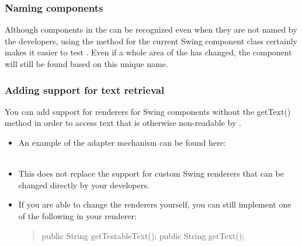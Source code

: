
\subsubsection{Naming components}
Although components in the \gdaut{} can be recognized even  when they are not named by the developers, using the  method for the current Swing component class certainly makes it easier to test \gdauts{}. Even if a whole area of the \gdaut{} has changed, the component will still be found based on this unique name. 

\subsubsection{Adding support for text retrieval}
You can add support for renderers for Swing components without the getText() method in order to access text that is otherwise non-readable by \app{}. 
\begin{itemize}
\item An example of the adapter mechanism can be found here:\\
\\
\item This does not replace the support for custom Swing renderers that can be changed directly by your developers. 
\item If you are able to change the renderers yourself, you can still implement one of the following in your renderer:
\begin{quote}
public String getTestableText();
public String getText();
\end{quote}
\end{itemize}
